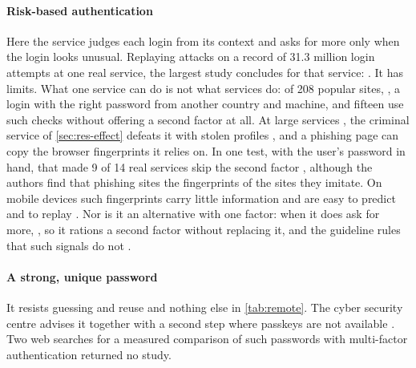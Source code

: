 \paragraph{Risk-based authentication}
Here the service judges each login from its context and asks for more
only when the login looks unusual.
Replaying attacks on a record of 31.3 million login attempts at one real
service, the largest study concludes for that service:
.
It has limits.
What one service can do is not what services do: of 208 popular sites,
, a login with the right
password from another country and machine, and fifteen use such checks
without offering a second factor at all.
At large services
, the criminal service of \cref{sec:res-effect} defeats
it with stolen profiles \autocite{Campobasso2020IMPaaS}, and a phishing
page can copy the browser fingerprints it relies on.
In one test, with the user's password in hand, that made 9 of 14 real
services skip the second factor \autocite[p.~1658]{Lin2022PhishSheep},
although the authors find that phishing sites
the fingerprints of the sites they imitate.
On mobile devices such fingerprints carry little information and are
easy to predict and to replay
\autocite[sec.~4.2 and~5.1]{Spooren2015Fingerprinting}.
Nor is it an alternative with one factor: when it does ask for more,
, so it rations a second factor
without replacing it, and the guideline rules that such signals do not
.

\paragraph{A strong, unique password}
It resists guessing and reuse and nothing else in \cref{tab:remote}.
The cyber security centre advises it together with a second step where
passkeys are not available \autocite{NCSC2026PasskeysPage}.
Two web searches for a measured comparison of such passwords with
multi-factor authentication returned no study.

